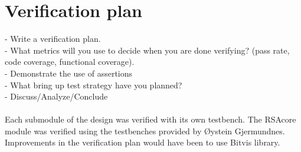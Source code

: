 \section{Verification plan}
- Write a verification plan.\\
- What metrics will you use to decide when you are done verifying?
(pass rate, code coverage, functional coverage).\\
- Demonstrate the use of assertions \\
- What bring up test strategy have you planned?\\ 
- Discuss/Analyze/Conclude\\
\\
Each submodule of the design was verified with its own testbench.
The RSAcore module was verified using the testbenches provided by Øystein Gjermundnes.
\\
Improvements in the verification plan would have been to use Bitvis library.